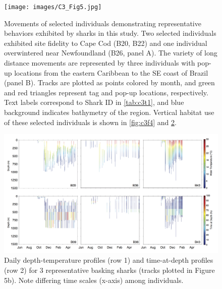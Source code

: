 \begin{figure}[t!]
\centering
\texttt{[image: images/C3\_Fig5.jpg]}
\caption[Representat]{Movements of selected individuals demonstrating representative behaviors exhibited by sharks in this study. Two selected individuals exhibited site fidelity to Cape Cod (B20, B22) and one individual overwintered near Newfoundland (B26, panel A). The variety of long distance movements are represented by three individuals with pop-up locations from the eastern Caribbean to the SE coast of Brazil (panel B). Tracks are plotted as points colored by month, and green and red triangles represent tag and pop-up locations, respectively. Text labels correspond to Shark ID in \cref{tab:c3t1}, and blue background indicates bathymetry of the region. Vertical habitat use of these selected individuals is shown in \cref{fig:c3f4} and \cref{fig:c3f6}. }
\label{fig:c3f5}
\end{figure}

\begin{figure}[t!]
\centering
\includegraphics[width=1\textwidth]{images/C3_Fig6.jpg}
\caption[Representative basking shark vertical data for long-range movements]{Daily depth-temperature profiles (row 1) and time-at-depth profiles (row 2) for 3 representative basking sharks (tracks plotted in Figure 5b). Note differing time scales (x-axis) among individuals.}
\label{fig:c3f6}
\end{figure}

